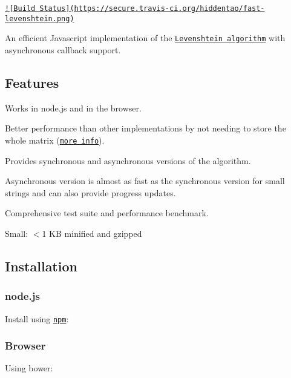 \href{http://travis-ci.org/hiddentao/fast-levenshtein}{\tt !\mbox{[}Build Status\mbox{]}(https\+://secure.\+travis-\/ci.\+org/hiddentao/fast-\/levenshtein.\+png)}

An efficient Javascript implementation of the \href{http://en.wikipedia.org/wiki/Levenshtein_distance}{\tt Levenshtein algorithm} with asynchronous callback support.

\subsection*{Features}


\begin{DoxyItemize}
\item Works in node.\+js and in the browser.
\item Better performance than other implementations by not needing to store the whole matrix (\href{http://www.codeproject.com/Articles/13525/Fast-memory-efficient-Levenshtein-algorithm}{\tt more info}).
\item Provides synchronous and asynchronous versions of the algorithm.
\item Asynchronous version is almost as fast as the synchronous version for small strings and can also provide progress updates.
\item Comprehensive test suite and performance benchmark.
\item Small\+: $<$1 K\+B minified and gzipped
\end{DoxyItemize}

\subsection*{Installation}

\subsubsection*{node.\+js}

Install using \href{http://npmjs.org/}{\tt npm}\+:




\subsubsection*{Browser}

Using bower\+:


